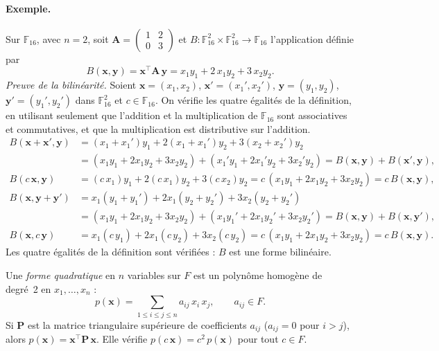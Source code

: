 \paragraph{Exemple.} Sur $\mathbb{F}_{16}$, avec $n=2$, soit $\mathbf{A}=\begin{pmatrix}1&2\\0&3\end{pmatrix}$ et $B:\mathbb{F}_{16}^2\times\mathbb{F}_{16}^2\to\mathbb{F}_{16}$ l'application définie par
\[B(\mathbf{x},\mathbf{y})=\mathbf{x}^{\top}\mathbf{A}\,\mathbf{y}=x_1y_1+2\,x_1y_2+3\,x_2y_2.\]
\emph{Preuve de la bilinéarité.} Soient $\mathbf{x}=(x_1,x_2)$, $\mathbf{x}'=(x_1',x_2')$, $\mathbf{y}=(y_1,y_2)$, $\mathbf{y}'=(y_1',y_2')$ dans $\mathbb{F}_{16}^2$ et $c\in\mathbb{F}_{16}$. On vérifie les quatre égalités de la définition, en utilisant seulement que l'addition et la multiplication de $\mathbb{F}_{16}$ sont associatives et commutatives, et que la multiplication est distributive sur l'addition.
\begin{align*}
B(\mathbf{x}+\mathbf{x}',\mathbf{y})&=(x_1+x_1')y_1+2(x_1+x_1')y_2+3(x_2+x_2')y_2\\
&=(x_1y_1+2x_1y_2+3x_2y_2)+(x_1'y_1+2x_1'y_2+3x_2'y_2)=B(\mathbf{x},\mathbf{y})+B(\mathbf{x}',\mathbf{y}),\\[1ex]
B(c\,\mathbf{x},\mathbf{y})&=(c\,x_1)y_1+2(c\,x_1)y_2+3(c\,x_2)y_2=c\,(x_1y_1+2x_1y_2+3x_2y_2)=c\,B(\mathbf{x},\mathbf{y}),\\[1ex]
B(\mathbf{x},\mathbf{y}+\mathbf{y}')&=x_1(y_1+y_1')+2x_1(y_2+y_2')+3x_2(y_2+y_2')\\
&=(x_1y_1+2x_1y_2+3x_2y_2)+(x_1y_1'+2x_1y_2'+3x_2y_2')=B(\mathbf{x},\mathbf{y})+B(\mathbf{x},\mathbf{y}'),\\[1ex]
B(\mathbf{x},c\,\mathbf{y})&=x_1(c\,y_1)+2x_1(c\,y_2)+3x_2(c\,y_2)=c\,(x_1y_1+2x_1y_2+3x_2y_2)=c\,B(\mathbf{x},\mathbf{y}).
\end{align*}
Les quatre égalités de la définition sont vérifiées : $B$ est une forme bilinéaire.

\begin{definition}
Une \emph{forme quadratique} en $n$ variables sur $F$ est un polynôme homogène de degré~2 en $x_1,\dots,x_n$ :
\[p(\mathbf{x})=\sum_{1\le i\le j\le n}a_{ij}\,x_i\,x_j,\qquad a_{ij}\in F.\]
Si $\mathbf{P}$ est la matrice triangulaire supérieure de coefficients $a_{ij}$ ($a_{ij}=0$ pour $i>j$), alors $p(\mathbf{x})=\mathbf{x}^{\top}\mathbf{P}\,\mathbf{x}$. Elle vérifie $p(c\,\mathbf{x})=c^2\,p(\mathbf{x})$ pour tout $c\in F$.
\end{definition}

